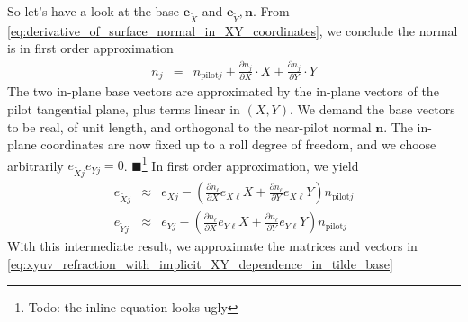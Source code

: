 \documentclass[12pt,a4paper,twoside,openright,BCOR10mm,headsepline,titlepage,abstracton,chapterprefix,final]{scrreprt}
\newcommand\Vector[1]{{\mathbf{#1}}}
\newcommand{\remark}[1]{{\color{red}$\blacksquare$}\footnote{{\color{red}#1}}}
\newcommand\pilot{\textrm{pilot}}
\begin{document}
So let's have a look at the base $\Vector{e}_{\tilde{X}}$ and $\Vector{e}_{\tilde{Y}}, \Vector{n}$.
From \eqref{eq:derivative_of_surface_normal_in_XY_coordinates},
we conclude the normal is in first order approximation
\begin{eqnarray}
 n_j &=& n_{\pilot j} + \frac{\partial n_j}{\partial X} \cdot X + \frac{\partial n_j}{\partial Y} \cdot Y
\end{eqnarray}
The two in-plane base vectors are approximated by the in-plane vectors of the pilot tangential plane, plus terms linear in $(X,Y)$.
We demand the base vectors to be real, of unit length, and orthogonal to the near-pilot normal $\Vector{n}$.
The in-plane coordinates are now fixed up to a roll degree of freedom, and we choose arbitrarily $e_{\tilde{X}j} e_{Yj} = 0$.
\remark{Todo: the inline equation looks ugly}
In first order approximation, we yield
\begin{eqnarray}
 e_{\tilde{X}j} &\approx& e_{Xj} - \left( \frac{\partial n_\ell}{\partial X} e_{X\ell} X + \frac{\partial n_\ell}{\partial Y} e_{X\ell} Y\right) n_{\pilot j}
\\
 e_{\tilde{Y}j} &\approx& e_{Yj} - \left( \frac{\partial n_\ell}{\partial X} e_{Y\ell} X + \frac{\partial n_\ell}{\partial Y} e_{Y\ell} Y\right) n_{\pilot j}
\end{eqnarray}
With this intermediate result, 
we approximate the matrices and vectors in \eqref{eq:xyuv_refraction_with_implicit_XY_dependence_in_tilde_base}
\end{document}
